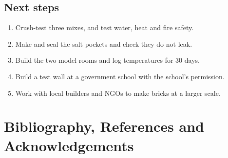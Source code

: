 \documentclass[11pt,a4paper]{article}
\let\origsection\section
\renewcommand{\section}{\clearpage\origsection}
\begin{document}
\subsection{Next steps}
\begin{enumerate}
  \item Crush-test three mixes, and test water, heat and fire safety.
  \item Make and seal the salt pockets and check they do not leak.
  \item Build the two model rooms and log temperatures for 30 days.
  \item Build a test wall at a government school with the school's permission.
  \item Work with local builders and NGOs to make bricks at a larger scale.
\end{enumerate}

\section{Bibliography, References and Acknowledgements}
\end{document}
